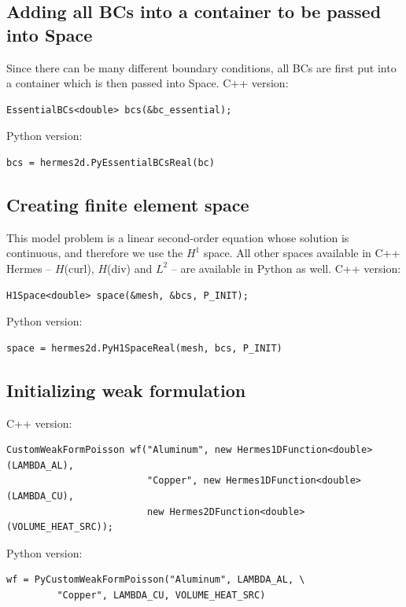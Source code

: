 \documentclass{article}
\begin{document}
\subsection*{Adding all BCs into a container to be passed into Space}

Since there can be many different boundary conditions, all BCs are 
first put into a container which is then passed into Space. C++ version:
{\small
\begin{verbatim}
EssentialBCs<double> bcs(&bc_essential);
\end{verbatim}
}
\noindent
Python version:

{\small
\begin{verbatim}
bcs = hermes2d.PyEssentialBCsReal(bc)
\end{verbatim}
}

\subsection*{Creating finite element space}

This model problem is a linear second-order equation whose solution 
is continuous, and therefore we use the $H^1$ space. All other spaces
available in C++ Hermes -- $H$(curl), $H$(div) and $L^2$ -- are available  
in Python as well. C++ version:

{\small
\begin{verbatim}
H1Space<double> space(&mesh, &bcs, P_INIT);
\end{verbatim}
}
\noindent
Python version:

{\small
\begin{verbatim}
space = hermes2d.PyH1SpaceReal(mesh, bcs, P_INIT)
\end{verbatim}
}

\subsection*{Initializing weak formulation}

C++ version:

{\small
\begin{verbatim}
CustomWeakFormPoisson wf("Aluminum", new Hermes1DFunction<double>(LAMBDA_AL), 
                         "Copper", new Hermes1DFunction<double>(LAMBDA_CU), 
                         new Hermes2DFunction<double>(VOLUME_HEAT_SRC));
\end{verbatim}
}
\noindent
Python version:

{\small
\begin{verbatim}
wf = PyCustomWeakFormPoisson("Aluminum", LAMBDA_AL, \
         "Copper", LAMBDA_CU, VOLUME_HEAT_SRC)
\end{verbatim}
}
\end{document}
